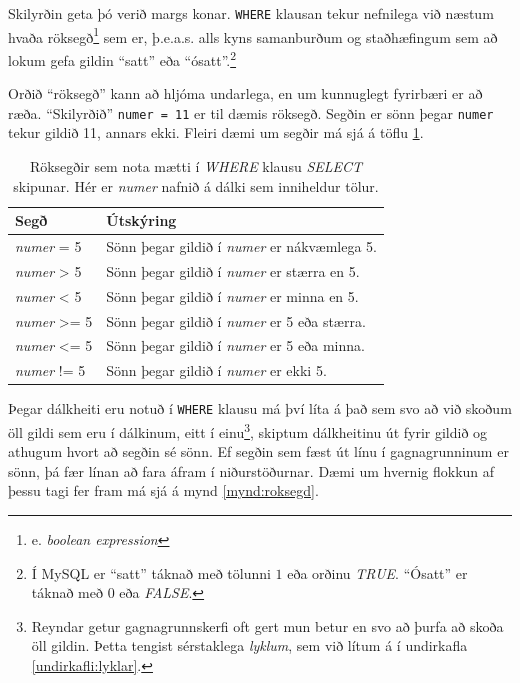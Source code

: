 Skilyrðin geta þó verið margs konar. \verb|WHERE| klausan tekur nefnilega við næstum hvaða röksegð\footnote{e. \emph{boolean expression}} sem er, þ.e.a.s. alls kyns samanburðum og staðhæfingum sem að lokum gefa gildin ``satt'' eða ``ósatt''.\footnote{Í MySQL er ``satt'' táknað með tölunni $1$ eða orðinu \emph{TRUE}. ``Ósatt'' er táknað með $0$ eða \emph{FALSE}.}

\newpage
Orðið ``röksegð'' kann að hljóma undarlega, en um kunnuglegt fyrirbæri er að ræða. ``Skilyrðið'' \verb|numer = 11| er til dæmis röksegð. Segðin er sönn þegar \verb|numer| tekur gildið 11, annars ekki. Fleiri dæmi um segðir má sjá á töflu \ref{tafla:samanburdir}.

\begin{table}
\centering
\caption[Röksegðir]{Röksegðir sem nota mætti í \emph{WHERE} klausu \emph{SELECT} skipunar. Hér er \emph{numer} nafnið á dálki sem inniheldur tölur.}
\label{tafla:samanburdir}
\begin{tabular}{ll}
\toprule
Segð&Útskýring\\
\midrule
\emph{numer} = 5&Sönn þegar gildið í \emph{numer} er nákvæmlega 5.\\
\emph{numer} > 5&Sönn þegar gildið í \emph{numer} er stærra en 5.\\
\emph{numer} < 5&Sönn þegar gildið í \emph{numer} er minna en 5.\\
\emph{numer} >= 5&Sönn þegar gildið í \emph{numer} er 5 eða stærra.\\
\emph{numer} <= 5&Sönn þegar gildið í \emph{numer} er 5 eða minna.\\
\emph{numer} != 5&Sönn þegar gildið í \emph{numer} er ekki 5.\\
\bottomrule
\end{tabular}
\end{table}

Þegar dálkheiti eru notuð í \verb|WHERE| klausu má því líta á það sem svo að við skoðum öll gildi sem eru í dálkinum, eitt í einu\footnote{Reyndar getur gagnagrunnskerfi oft gert mun betur en svo að þurfa að skoða öll gildin. Þetta tengist sérstaklega \emph{lyklum}, sem við lítum á í undirkafla \ref{undirkafli:lyklar}.}, skiptum dálkheitinu út fyrir gildið og athugum hvort að segðin sé sönn. Ef segðin sem fæst út línu í gagnagrunninum er sönn, þá fær línan að fara áfram í niðurstöðurnar. Dæmi um hvernig flokkun af þessu tagi fer fram má sjá á mynd \ref{mynd:roksegd}.

